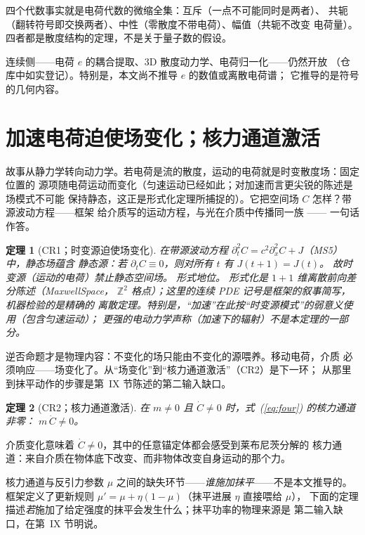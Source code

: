 \documentclass[aps,prd,preprint,superscriptaddress,amsmath,amssymb]{revtex4-2}
\newtheorem{theorem}{定理}[section]
\begin{document}
四个代数事实就是电荷代数的微缩全集：互斥（一点不可能同时是两者）、
共轭（翻转符号即交换两者）、中性（零散度不带电荷）、幅值（共轭不改变
电荷量）。四者都是散度结构的定理，不是关于量子数的假设。

连续侧——电荷 $e$ 的耦合提取、3D 散度动力学、电荷归一化——仍然开放
（仓库中如实登记）。特别是，本文尚不推导 $e$ 的数值或离散电荷谱；
它推导的是符号的几何内容。

\section{加速电荷迫使场变化；核力通道激活}
\label{sec:accel}

故事从静力学转向动力学。若电荷是流的散度，运动的电荷就是时变散度场：固定位置的
源项随电荷运动而变化（匀速运动已经如此；对加速而言更尖锐的陈述是场模式不可能
保持静态，这正是形式化定理所捕捉的）。它把空间场 $C$ 怎样？带源波动方程——框架
给介质写的运动方程，与光在介质中传播同一族 \cite{gordon1923lichtfortpflanzung}——
一句话作答。

\begin{theorem}[CR1；时变源迫使场变化]
\label{thm:cr1}
在带源波动方程 $\partial_t^2 C=c^2\partial_x^2 C+J$（MS5）中，静态场蕴含
静态源：若 $\partial_t C\equiv 0$，则对所有 $t$ 有 $J(t{+}1)=J(t)$。
故时变源（运动的电荷）禁止静态空间场。
\emph{形式地位。} 形式化是 $1{+}1$ 维离散前向差分陈述（MaxwellSpace，
$\mathbb{Z}^2$ 格点）；这里的连续 PDE 记号是框架的叙事简写，机器检验的是精确的
离散定理。特别是，``加速''在此按``时变源模式''的弱意义使用（包含匀速运动）；
更强的电动力学声称（加速下的辐射）不是本定理的一部分。
\end{theorem}

逆否命题才是物理内容：不变化的场只能由不变化的源喂养。移动电荷，介质
必须响应——场变化了。从``场变化''到``核力通道激活''（CR2）是下一环；
从那里到抹平动作的步骤是第~IX 节陈述的第二输入缺口。

\begin{theorem}[CR2；核力通道激活]
\label{thm:cr2}
在 $m\neq 0$ 且 $\dot C\neq 0$ 时，式~(\ref{eq:four}) 的核力通道非零：
$m\,\dot C\neq 0$。
\end{theorem}

介质变化意味着 $\dot C\neq 0$，其中的任意锚定体都会感受到莱布尼茨分解的
核力通道：来自介质在物体底下改变、而非物体改变自身运动的那个力。

核力通道与反引力参数 $\mu$ 之间的缺失环节——\emph{谁施加抹平}——不是本文推导的。
框架定义了更新规则 $\mu'=\mu+\eta(1-\mu)$（抹平进展 $\eta$ 直接喂给 $\mu$），
下面的定理描述\emph{若}施加了给定强度的抹平会发生什么；抹平功率的物理来源是
第二输入缺口，在第~IX 节明说。
\end{document}
